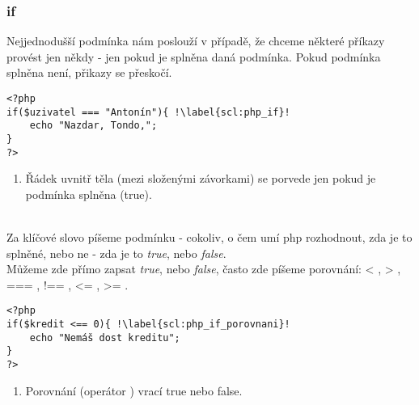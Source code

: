 \subsubsection{if}
Nejjednodušší podmínka  nám poslouží v případě, že chceme některé příkazy provést jen někdy - jen pokud je splněna daná podmínka. Pokud podmínka splněna není, přikazy se přeskočí.\\
\begin{minipage}[t]{.45\textwidth}
\begin{code}
\begin{verbatim}
<?php
if($uzivatel === "Antonín"){ !\label{scl:php_if}!
	echo "Nazdar, Tondo,";
}
?>
\end{verbatim}

\label{code:php_if}
\end{code}
\end{minipage}
\begin{minipage}[t]{.45\textwidth}
\begin{enumerate}
\item[ř. \ref{scl:php_if}:] Řádek uvnitř těla (mezi složenými závorkami) se porvede jen pokud je podmínka splněna (true).
\end{enumerate}
\end{minipage}\\

Za klíčové slovo  píšeme podmínku - cokoliv, o čem umí php rozhodnout, zda je to splněné, nebo ne - zda je to \textit{true}, nebo \textit{false}.\\
Můžeme zde přímo zapsat \textit{true}, nebo \textit{false}, často zde píšeme porovnání: < , > , === , !== , <= , >= .\\

\begin{minipage}[t]{.45\textwidth}
\begin{code}
\begin{verbatim}
<?php
if($kredit <== 0){ !\label{scl:php_if_porovnani}!
	echo "Nemáš dost kreditu";
}
?>
\end{verbatim}

\label{code:php_if_porovnání}
\end{code}
\end{minipage}
\begin{minipage}[t]{.45\textwidth}
\begin{enumerate}
\item[ř. \ref{scl:php_if_porovnani}:] Porovnání (operátor \uv{<==}) vrací true nebo false.
\end{enumerate}
\end{minipage}\\

